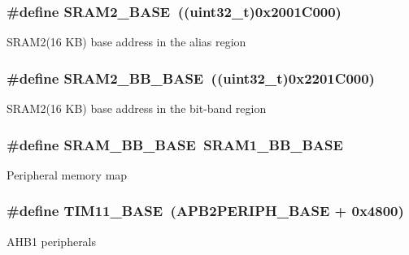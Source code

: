\subsubsection[{\texorpdfstring{S\+R\+A\+M2\+\_\+\+B\+A\+SE}{SRAM2_BASE}}]{\setlength{\rightskip}{0pt plus 5cm}\#define S\+R\+A\+M2\+\_\+\+B\+A\+SE~((uint32\+\_\+t)0x2001\+C000)}\hypertarget{group___peripheral__memory__map_gadbb42a3d0a8a90a79d2146e4014241b1}{}\label{group___peripheral__memory__map_gadbb42a3d0a8a90a79d2146e4014241b1}
S\+R\+A\+M2(16 K\+B) base address in the alias region 
\subsubsection[{\texorpdfstring{S\+R\+A\+M2\+\_\+\+B\+B\+\_\+\+B\+A\+SE}{SRAM2_BB_BASE}}]{\setlength{\rightskip}{0pt plus 5cm}\#define S\+R\+A\+M2\+\_\+\+B\+B\+\_\+\+B\+A\+SE~((uint32\+\_\+t)0x2201\+C000)}\hypertarget{group___peripheral__memory__map_gac33cb6edadf184ab9860d77089503922}{}\label{group___peripheral__memory__map_gac33cb6edadf184ab9860d77089503922}
S\+R\+A\+M2(16 K\+B) base address in the bit-\/band region 
\subsubsection[{\texorpdfstring{S\+R\+A\+M\+\_\+\+B\+B\+\_\+\+B\+A\+SE}{SRAM_BB_BASE}}]{\setlength{\rightskip}{0pt plus 5cm}\#define S\+R\+A\+M\+\_\+\+B\+B\+\_\+\+B\+A\+SE~{\bf S\+R\+A\+M1\+\_\+\+B\+B\+\_\+\+B\+A\+SE}}\hypertarget{group___peripheral__memory__map_gad3548b6e2f017f39d399358f3ac98454}{}\label{group___peripheral__memory__map_gad3548b6e2f017f39d399358f3ac98454}
Peripheral memory map 
\subsubsection[{\texorpdfstring{T\+I\+M11\+\_\+\+B\+A\+SE}{TIM11_BASE}}]{\setlength{\rightskip}{0pt plus 5cm}\#define T\+I\+M11\+\_\+\+B\+A\+SE~(A\+P\+B2\+P\+E\+R\+I\+P\+H\+\_\+\+B\+A\+SE + 0x4800)}\hypertarget{group___peripheral__memory__map_ga3a4a06bb84c703084f0509e105ffaf1d}{}\label{group___peripheral__memory__map_ga3a4a06bb84c703084f0509e105ffaf1d}
A\+H\+B1 peripherals 